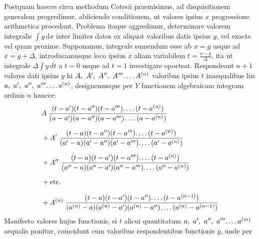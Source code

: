 Postquam haecce circa methodum Cotesii praemisimus, ad disquisitionem
generalem progredimur, abiiciendo conditionem, ut valores ipsius $x$ progressione
arithmetica procedant. Problema itaque aggredimur, determinare valorem integralis
$\int y\,\mathrm{d}x$ inter limites datos ex aliquot valoribus datis ipsius $y$, vel exacte vel
quam proxime. Supponamus, integrale sumendum esse ab $x=g$ usque ad
$x=g+\Delta$, introducamusque loco ipsius $x$ aliam variabilem $t=\frac{x-g}{\Delta}$, ita ut
integrale $\Delta\int y\,\mathrm{d}t$ a $t=0$ usque ad $t=1$ investigare oporteat. Respondeant
$n+1$ valores dati ipsius $y$ hi $A,\ A',\ A'',\ A'''\ldotp\ldotp\ldotp\ldotp A^{(n)}$ valoribus ipsius $t$ inaequalibus
his $a,\ a',\ a'',\ a'''\ldotp\ldotp\ldotp\ldotp a^{(n)}$, designemusque per $Y$ functionem algebraicam integram
ordinis $n$ hancce:
\[
\begin{aligned}
& A\;\frac{(t-a')(t-a'')(t-a''')\ldotp\ldotp\ldotp\ldotp(t-a^{(n)})}
{(a-a')(a-a'')(a-a''')\ldotp\ldotp\ldotp\ldotp(a-a^{(n)})}\\[6pt]
&{}+A'\;\frac{(t-a)(t-a'')(t-a''')\ldotp\ldotp\ldotp\ldotp(t-a^{(n)})}
{(a'-a)(a'-a'')(a'-a''')\ldotp\ldotp\ldotp\ldotp(a'-a^{(n)})}\\[6pt]
&{}+A''\;\frac{(t-a)(t-a')(t-a''')\ldotp\ldotp\ldotp\ldotp(t-a^{(n)})}
{(a''-a)(a''-a')(a''-a''')\ldotp\ldotp\ldotp\ldotp(a''-a^{(n)})}\\[6pt]
&{}+\text{etc.}\\[6pt]
&{}+A^{(n)}\;\frac{(t-a)(t-a')(t-a'')\ldotp\ldotp\ldotp\ldotp(t-a^{(n-1)})}
{(a^{(n)}-a)(a^{(n)}-a')(a^{(n)}-a'')\ldotp\ldotp\ldotp\ldotp(a^{(n)}-a^{(n-1)})}
\end{aligned}
\]
Manifesto valores hujus functionis, si $t$ alicui quantitatum $a,\allowbreak \ a',\allowbreak \ a'',\allowbreak \ a'''\ldotp\ldotp\ldotp\ldotp a^{(m)}$
aequalis ponitur, coincidunt cum valoribus respondentibus functionis $y$, unde per
